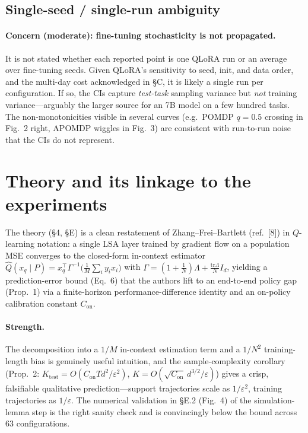 \documentclass[11pt]{article}
\newcommand{\Qhat}{\widehat{Q}}
\newcommand{\Lam}{\Lambda}
\newcommand{\Ktest}{K_{\mathrm{test}}}
\newcommand{\Con}{C_{\mathrm{on}}}
\begin{document}
\subsection{Single-seed / single-run ambiguity}

\paragraph{Concern (moderate): fine-tuning stochasticity is not propagated.} It is not stated
whether each reported point is one QLoRA run or an average over fine-tuning seeds. Given
QLoRA's sensitivity to seed, init, and data order, and the multi-day cost acknowledged in
\S C, it is likely a single run per configuration. If so, the CIs capture
\emph{test-task} sampling variance but \emph{not} training variance---arguably the larger
source for an 7B model on a few hundred tasks. The non-monotonicities visible in several
curves (e.g.\ POMDP $q=0.5$ crossing in Fig.\ 2 right, APOMDP wiggles in Fig.\ 3) are
consistent with run-to-run noise that the CIs do not represent.

\section{Theory and its linkage to the experiments}

The theory (\S4, \S E) is a clean restatement of Zhang--Frei--Bartlett (ref.\ [8]) in
$Q$-learning notation: a single LSA layer trained by gradient flow on a population MSE
converges to the closed-form in-context estimator
$\Qhat(x_q\mid P)=x_q^\top \Gamma^{-1}\!\big(\tfrac1M\sum_i y_i x_i\big)$ with
$\Gamma=(1+\tfrac1N)\Lam+\tfrac{\mathrm{tr}\Lam}{N}I_d$, yielding a prediction-error bound (Eq.\ 6)
that the authors lift to an end-to-end policy gap (Prop.\ 1) via a finite-horizon
performance-difference identity and an on-policy calibration constant $\Con$.

\paragraph{Strength.} The decomposition into a $1/M$ in-context estimation term and a $1/N^2$
training-length bias is genuinely useful intuition, and the sample-complexity corollary
(Prop.\ 2: $\Ktest=O(\Con T d^2/\varepsilon^2)$, $K=O(\sqrt{\Con}\,d^{3/2}/\varepsilon)$)
gives a crisp, falsifiable qualitative prediction---support trajectories scale as
$1/\varepsilon^2$, training trajectories as $1/\varepsilon$. The numerical validation in \S E.2
(Fig.\ 4) of the simulation-lemma step is the right sanity check and is convincingly below the
bound across 63 configurations.
\end{document}
